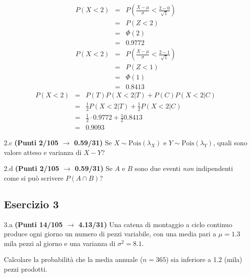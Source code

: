 \documentclass[
  11pt,
]{book}
\theoremstyle{mytheoremstyle}
\theoremstyle{mydefstyle}
\newenvironment{sol}
  {
  \begin{tcolorbox}[enhanced,breakable,arc=0.1mm,boxrule=1pt,colback=white,colframe=iblue,
  title=\bf \fontfamily{lmss}\selectfont \hspace{.5 cm} Soluzione,drop fuzzy shadow]

}{
\end{tcolorbox}
  }
\begin{document}
\begin{sol}
\begin{eqnarray*}
      P( X   <   2 ) 
        &=& P\left(  \frac { X  -  \mu }{ \sigma }  <  \frac { 2  -  0 }{\sqrt{ 1 }} \right)  \\
                 &=& P\left(  Z   <   2 \right) \\    
                 &=&  \Phi( 2 ) \\ &=&  0.9772 
      \end{eqnarray*}\begin{eqnarray*}
      P( X   <   2 ) 
        &=& P\left(  \frac { X  -  \mu }{ \sigma }  <  \frac { 2  -  1 }{\sqrt{ 1 }} \right)  \\
                 &=& P\left(  Z   <   1 \right) \\    
                 &=&  \Phi( 1 ) \\ &=&  0.8413 
      \end{eqnarray*}
\begin{eqnarray*}
P(X<2) &=& P(T)P(X<2|T)+P(C)P(X<2|C)\\
&=& \frac 12P(X<2|T)+\frac 12P(X<2|C)\\
&=& \frac 12\cdot 0.9772+\frac 12 0.8413\\
&=& 0.9093
\end{eqnarray*}

\end{sol}

2.c \textbf{(Punti 2/105 \(\rightarrow\) 0.59/31)} Se \(X\sim\text{Pois}(\lambda_X)\) e \(Y\sim\text{Pois}(\lambda_Y)\), quali sono valore atteso e varianza
di \(X-Y\)?

2.d \textbf{(Punti 2/105 \(\rightarrow\) 0.59/31)} Se \(A\) e \(B\) sono due eventi \emph{non} indipendenti come si può scrivere \(P(A\cap B)\)?

\subsection{Esercizio 3}\label{esercizio-3-29}

3.a \textbf{(Punti 14/105 \(\rightarrow\) 4.13/31)} Una catena di montaggio a ciclo continuo produce ogni giorno un numero di pezzi variabile, con una media pari a
\(\mu=1.3\) mila pezzi al giorno e una varianza di \(\sigma^2=8.1\).

Calcolare la probabilità che la media annuale (\(n=365\)) sia inferiore a 1.2 (mila) pezzi prodotti.
\end{document}

